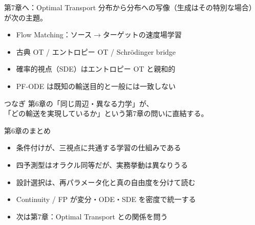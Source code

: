 \asmain
\begin{frame}{第7章へ：Optimal Transport}
    分布から分布への写像（生成はその特別な場合）が次の主題。
    \begin{itemize}
        \item Flow Matching：ソース$\to$ターゲットの速度場学習
        \item 古典 OT / エントロピー OT / Schr\"odinger bridge
        \item 確率的視点（SDE）はエントロピー OT と親和的
        \item PF-ODE は既知の輸送目的と一般には一致しない
    \end{itemize}
    \begin{block}{つなぎ}
        第6章の「同じ周辺・異なる力学」が、\\
        「どの輸送を実現しているか」という第7章の問いに直結する。
    \end{block}
\end{frame}
\asmain
\begin{frame}{第6章のまとめ}
    \begin{itemize}
        \item 条件付けが、三視点に共通する学習の仕組みである
        \item 四予測型はオラクル同等だが、実務挙動は異なりうる
        \item 設計選択は、再パラメータ化と真の自由度を分けて読む
        \item Continuity / FP が変分・ODE・SDE を密度で統一する
        \item 次は第7章：Optimal Transport との関係を問う
    \end{itemize}
\end{frame}
